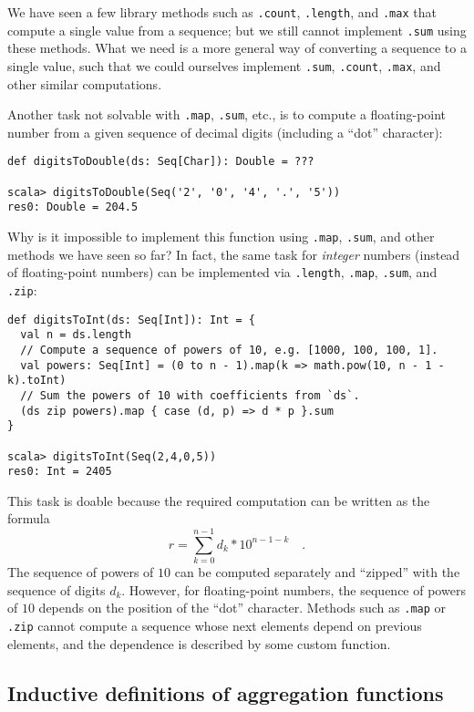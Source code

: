 We have seen a few library methods such as \lstinline!.count!, \lstinline!.length!,
and \lstinline!.max! that compute a single value from a sequence;
but we still cannot implement \lstinline!.sum! using these methods.
What we need is a more general way of converting a sequence to a single
value, such that we could ourselves implement \lstinline!.sum!, \lstinline!.count!,
\lstinline!.max!, and other similar computations.

Another task not solvable with \lstinline!.map!, \lstinline!.sum!,
etc., is to compute a floating-point number from a given sequence
of decimal digits (including a ``dot'' character):
\begin{lstlisting}
def digitsToDouble(ds: Seq[Char]): Double = ???

scala> digitsToDouble(Seq('2', '0', '4', '.', '5'))
res0: Double = 204.5
\end{lstlisting}
Why is it impossible to implement this function using \lstinline!.map!,
\lstinline!.sum!, and other methods we have seen so far? In fact,
the same task for \emph{integer} numbers (instead of floating-point
numbers) can be implemented via \lstinline!.length!, \lstinline!.map!,
\lstinline!.sum!, and \lstinline!.zip!:
\begin{lstlisting}
def digitsToInt(ds: Seq[Int]): Int = {
  val n = ds.length
  // Compute a sequence of powers of 10, e.g. [1000, 100, 100, 1].
  val powers: Seq[Int] = (0 to n - 1).map(k => math.pow(10, n - 1 - k).toInt)
  // Sum the powers of 10 with coefficients from `ds`.
  (ds zip powers).map { case (d, p) => d * p }.sum                                  
}

scala> digitsToInt(Seq(2,4,0,5))
res0: Int = 2405
\end{lstlisting}
This task is doable because the required computation can be written
as the formula
\[
r=\sum_{k=0}^{n-1}d_{k}*10^{n-1-k}\quad.
\]
The sequence of powers of $10$ can be computed separately and ``zipped''
with the sequence of digits $d_{k}$. However, for floating-point
numbers, the sequence of powers of $10$ depends on the position of
the ``dot'' character. Methods such as \lstinline!.map! or \lstinline!.zip!
cannot compute a sequence whose next elements depend on previous elements,
and the dependence is described by some custom function.

\subsection{Inductive definitions of aggregation functions\label{subsec:Inductive-definitions-of-aggregation-functions}}

